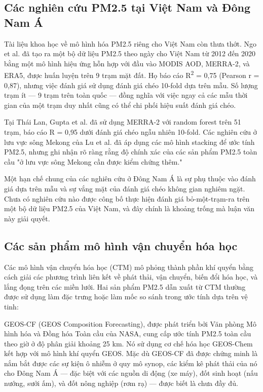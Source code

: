 \subsection{Các nghiên cứu PM2.5 tại Việt Nam và Đông Nam Á}

Tài liệu khoa học về mô hình hóa PM2.5 riêng cho Việt Nam còn thưa thớt. Ngo et al. \cite{ngo2023} đã tạo ra một bộ dữ liệu PM2.5 theo ngày cho Việt Nam từ 2012 đến 2020 bằng một mô hình hiệu ứng hỗn hợp với đầu vào MODIS AOD, MERRA-2, và ERA5, được huấn luyện trên 9 trạm mặt đất. Họ báo cáo R\textsuperscript{2} = 0,75 (Pearson r = 0,87), nhưng việc đánh giá sử dụng đánh giá chéo 10-fold dựa trên mẫu. Số lượng trạm ít --- 9 trạm trên toàn quốc --- đồng nghĩa với việc ngay cả các mẫu thời gian của một trạm duy nhất cũng có thể chi phối hiệu suất đánh giá chéo.

Tại Thái Lan, Gupta et al. \cite{gupta2021} đã sử dụng MERRA-2 với random forest trên 51 trạm, báo cáo R = 0,95 dưới đánh giá chéo ngẫu nhiên 10-fold. Các nghiên cứu ở lưu vực sông Mekong của Lu et al. \cite{lu2024} đã áp dụng các mô hình stacking để ước tính PM2.5, nhưng ghi nhận rõ ràng rằng độ chính xác của các sản phẩm PM2.5 toàn cầu "ở lưu vực sông Mekong cần được kiểm chứng thêm."

Một hạn chế chung của các nghiên cứu ở Đông Nam Á là sự phụ thuộc vào đánh giá dựa trên mẫu và sự vắng mặt của đánh giá chéo không gian nghiêm ngặt. Chưa có nghiên cứu nào được công bố thực hiện đánh giá bỏ-một-trạm-ra trên một bộ dữ liệu PM2.5 của Việt Nam, và đây chính là khoảng trống mà luận văn này giải quyết.

\subsection{Các sản phẩm mô hình vận chuyển hóa học}

Các mô hình vận chuyển hóa học (CTM) mô phỏng thành phần khí quyển bằng cách giải các phương trình liên kết về phát thải, vận chuyển, biến đổi hóa học, và lắng đọng trên các miền lưới. Hai sản phẩm PM2.5 dẫn xuất từ CTM thường được sử dụng làm đặc trưng hoặc làm mốc so sánh trong ước tính dựa trên vệ tinh:

GEOS-CF (GEOS Composition Forecasting), được phát triển bởi Văn phòng Mô hình hóa và Đồng hóa Toàn cầu của NASA, cung cấp ước tính PM2.5 toàn cầu theo giờ ở độ phân giải khoảng 25 km. Nó sử dụng cơ chế hóa học GEOS-Chem kết hợp với mô hình khí quyển GEOS. Mặc dù GEOS-CF đã được chứng minh là nắm bắt được các sự kiện ô nhiễm ở quy mô synop, các kiểm kê phát thải của nó cho Đông Nam Á --- đặc biệt với các nguồn di động (xe máy), đốt sinh hoạt (nấu nướng, sưởi ấm), và đốt nông nghiệp (rơm rạ) --- được biết là chưa đầy đủ.


